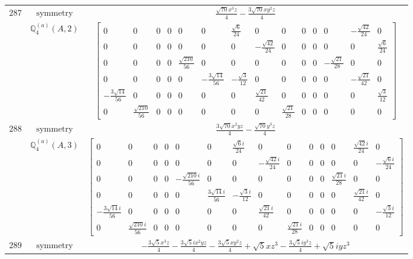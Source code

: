 \documentclass[fleqn,8pt,landscape]{jsarticle}
\begin{document}
\begin{longtable}{ccc}
$ 287 $ & $ \text{symmetry} $ & $ \frac{\sqrt{70} x^{3} z}{4} - \frac{3 \sqrt{70} x y^{2} z}{4} $ \\
$  $ & $ \mathbb{Q}_{4}^{(a)}(A,2) $ & $ \begin{bmatrix} 0 & 0 & 0 & 0 & 0 & 0 & \frac{\sqrt{6}}{24} & 0 & 0 & 0 & 0 & 0 & - \frac{\sqrt{42}}{24} & 0 \\ 0 & 0 & 0 & 0 & 0 & 0 & 0 & - \frac{\sqrt{42}}{24} & 0 & 0 & 0 & 0 & 0 & \frac{\sqrt{6}}{24} \\ 0 & 0 & 0 & 0 & \frac{\sqrt{210}}{56} & 0 & 0 & 0 & 0 & 0 & 0 & - \frac{\sqrt{21}}{28} & 0 & 0 \\ 0 & 0 & 0 & 0 & 0 & - \frac{3 \sqrt{14}}{56} & - \frac{\sqrt{3}}{12} & 0 & 0 & 0 & 0 & 0 & - \frac{\sqrt{21}}{42} & 0 \\ - \frac{3 \sqrt{14}}{56} & 0 & 0 & 0 & 0 & 0 & 0 & \frac{\sqrt{21}}{42} & 0 & 0 & 0 & 0 & 0 & \frac{\sqrt{3}}{12} \\ 0 & \frac{\sqrt{210}}{56} & 0 & 0 & 0 & 0 & 0 & 0 & \frac{\sqrt{21}}{28} & 0 & 0 & 0 & 0 & 0 \end{bmatrix} $ \\ \hline
$ 288 $ & $ \text{symmetry} $ & $ \frac{3 \sqrt{70} x^{2} y z}{4} - \frac{\sqrt{70} y^{3} z}{4} $ \\
$  $ & $ \mathbb{Q}_{4}^{(a)}(A,3) $ & $ \begin{bmatrix} 0 & 0 & 0 & 0 & 0 & 0 & \frac{\sqrt{6} i}{24} & 0 & 0 & 0 & 0 & 0 & \frac{\sqrt{42} i}{24} & 0 \\ 0 & 0 & 0 & 0 & 0 & 0 & 0 & - \frac{\sqrt{42} i}{24} & 0 & 0 & 0 & 0 & 0 & - \frac{\sqrt{6} i}{24} \\ 0 & 0 & 0 & 0 & - \frac{\sqrt{210} i}{56} & 0 & 0 & 0 & 0 & 0 & 0 & \frac{\sqrt{21} i}{28} & 0 & 0 \\ 0 & 0 & 0 & 0 & 0 & \frac{3 \sqrt{14} i}{56} & - \frac{\sqrt{3} i}{12} & 0 & 0 & 0 & 0 & 0 & \frac{\sqrt{21} i}{42} & 0 \\ - \frac{3 \sqrt{14} i}{56} & 0 & 0 & 0 & 0 & 0 & 0 & \frac{\sqrt{21} i}{42} & 0 & 0 & 0 & 0 & 0 & - \frac{\sqrt{3} i}{12} \\ 0 & \frac{\sqrt{210} i}{56} & 0 & 0 & 0 & 0 & 0 & 0 & \frac{\sqrt{21} i}{28} & 0 & 0 & 0 & 0 & 0 \end{bmatrix} $ \\ \hline
$ 289 $ & $ \text{symmetry} $ & $ - \frac{3 \sqrt{5} x^{3} z}{4} - \frac{3 \sqrt{5} i x^{2} y z}{4} - \frac{3 \sqrt{5} x y^{2} z}{4} + \sqrt{5} x z^{3} - \frac{3 \sqrt{5} i y^{3} z}{4} + \sqrt{5} i y z^{3} $ \\

\end{longtable}
\end{document}
